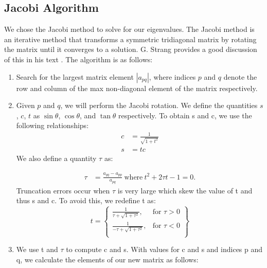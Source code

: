 \documentclass{article}
\begin{document}
\subsection{Jacobi Algorithm}
We chose the Jacobi method to solve for our eigenvalues. The Jacobi method is an iterative method that transforms a symmetric tridiagonal matrix by rotating the matrix until it converges to a solution. G. Strang provides a good discussion of this in his text \cite{textbook}. The algorithm is as follows:

\begin{enumerate}
	\item Search for the largest matrix element $|a_{pq}|$, where indices $p$ and $q$ denote the row and column of the max non-diagonal element of the matrix respectively.
	\item Given $p$ and $q$, we will perform the Jacobi rotation. We define the quantities $s$, $c$, $t$ as $\sin\theta$, $\cos\theta$, and $\tan\theta$ respectively. To obtain s and c, we use the following relationships:
\begin{align*}
	c &= \frac{1}{\sqrt{1+t^{2}}}\\  
	s &= tc 
\end{align*}
    We also define a quantity $\tau$ as:
    
\begin{align*}
	\tau &= \frac{a_{qq} - a_{pp}}{a_{pq}} \ \text{where} \ t^{2} + 2\tau t - 1 = 0. 
\end{align*}
	Truncation errors occur when $\tau$ is very large which skew the value of t and thus s and c. To avoid this, we redefine t as:
	\[
	t = \left\{\begin{array}{lr}
	\frac{1}{\tau+\sqrt{1+\tau^{2}}}, & \text{for } \tau > 0\\
	\frac{1}{-\tau+\sqrt{1+\tau^{2}}}, & \text{for } \tau < 0\\
	\end{array}\right\}
	\]    
    \item We use t and $\tau$ to compute c and s. With values for c and s and indices p and q, we calculate the elements of our new matrix as follows:


\end{enumerate}
\end{document}
